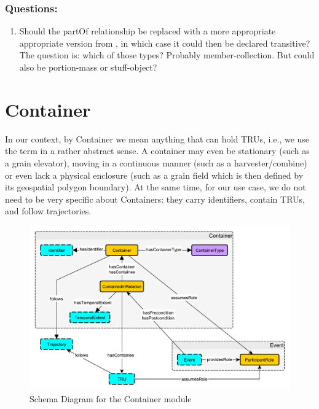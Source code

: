 \subsubsection*{Questions:}
\begin{enumerate}
    \item Should the \textsf{partOf} relationship be replaced with a more  appropriate appropriate version from \cite{MODL}, in which case it could then be declared transitive? The question is: which of those types? Probably member-collection. But could also be portion-mass or stuff-object?
\end{enumerate}

\section{Container}
\label{ssec:containers}
In our context, by Container we mean anything that can hold TRUs, i.e., we use the term in a rather abstract sense. A container may even be stationary (such as a grain elevator), moving in a continuous manner (such as a harvester/combine) or even lack a physical enclosure (such as a grain field which is then defined by its geospatial polygon boundary). At the same time, for our use case, we do not need to be very specific about Containers: they carry identifiers, contain TRUs, and follow trajectories. 

\begin{figure}[tb]
\begin{center}
\includegraphics[width=\textwidth]{diagrams/container}
\end{center}
\caption{Schema Diagram for the Container module}
\label{fig:Containers}
\end{figure}


